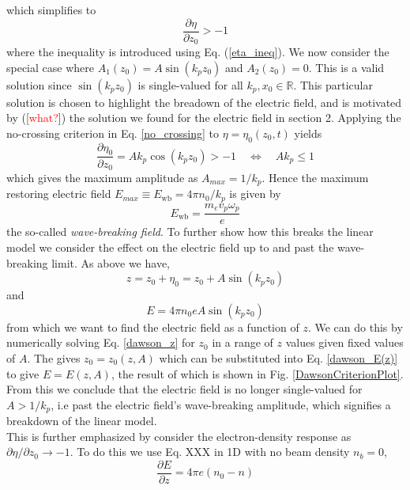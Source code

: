 which simplifies to
\begin{equation}
\frac{\partial \eta}{\partial z_0}>-1
\label{no_crossing}
\end{equation}
where the inequality is introduced using Eq. (\ref{eta_ineq}). We now consider the special case where $A_1(z_0)=A\sin(k_pz_0)$ and $A_2(z_0)=0$. This is a valid solution since $\sin(k_pz_0)$ is single-valued for all $k_p,x_0\in\mathbb{R}$. This particular solution is chosen to highlight the breadown of the electric field, and is motivated by ([\textcolor{red}{what?}]) the solution we found for the electric field in section 2. Applying the no-crossing criterion in Eq. \ref{no_crossing} to $\eta=\eta_0(z_0,t)$ yields
\begin{equation}
\frac{\partial \eta_0}{\partial z_0}=Ak_p\cos(k_pz_0)>-1 \quad \Leftrightarrow \quad Ak_p\leq 1
\end{equation}
which gives the maximum amplitude as $A_{max}=1/k_p$. Hence the maximum restoring electric field $E_{max}\equiv E_{\text{wb}}=4\pi n_0/k_p$ is given by
\begin{equation}
E_{\text{wb}}=\frac{m_ev_p\omega_p}{e}
\end{equation}
the so-called \textit{wave-breaking field}. To further show how this breaks the linear model we consider the effect on the electric field up to and past the wave-breaking limit. As above we have, 
\begin{equation}
z=z_0+\eta_0=z_0+A\sin(k_p z_0)
\label{dawson_z}
\end{equation}
and 
\begin{equation}
E=4\pi n_0e A\sin(k_p z_0)
\label{dawson_E(z)}
\end{equation}
from which we want to find the electric field as a function of $z$. We can do this by numerically solving Eq. \ref{dawson_z} for $z_0$ in a range of $z$ values given fixed values of $A$. The gives $z_0=z_0(z,A)$ which can be substituted into Eq. \ref{dawson_E(z)} to give $E=E(z,A)$, the result of which is shown in Fig. \ref{DawsonCriterionPlot}. From this we conclude that the electric field is no longer single-valued for $A>1/k_p$, i.e past the electric field's wave-breaking amplitude, which signifies a breakdown of the linear model.\\
This is further emphasized by consider the electron-density response as $\partial \eta/\partial z_0\to -1$. To do this we use  Eq. XXX in 1D with no beam density $n_b=0$, 
\begin{equation}
\frac{\partial E}{\partial z}=4\pi e(n_0-n)
\end{equation}
